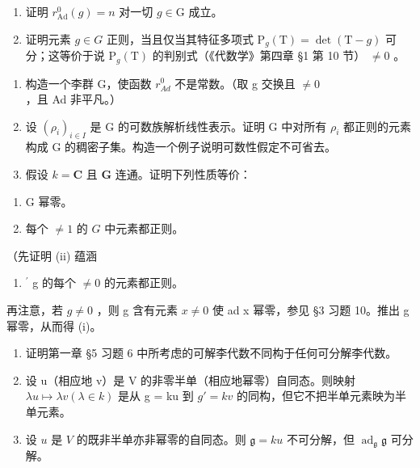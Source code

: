\begin{enumerate}
\def\labelenumi{\alph{enumi})}
\item
  证明 \(r_{\mathrm{Ad}}^0 (g) = n\) 对一切 \(g \in \mathrm{G}\) 成立。
\item
  证明元素 \(g \in G\) 正则，当且仅当其特征多项式 \(\mathrm{P}_{g}(\mathrm{T}) = \det(\mathrm{T} - g)\) 可分；这等价于说 \(\mathrm{P}_{g}(\mathrm{T})\) 的判别式（《代数学》第四章 §1 第 10 节） \(\neq 0\) 。
\end{enumerate}

\begin{enumerate}
\def\labelenumi{\arabic{enumi})}
\setcounter{enumi}{1}
\item
  构造一个李群 G，使函数 \(r_{Ad}^{0}\) 不是常数。（取 g 交换且 \(\neq 0\) ，且 Ad 非平凡。）
\item
  设 \((\rho_{i})_{i\in I}\) 是 G 的可数族解析线性表示。证明 G 中对所有 \(\rho_{i}\) 都正则的元素构成 G 的稠密子集。构造一个例子说明可数性假定不可省去。
\item
  假设 \(k = \mathbf{C}\) 且 \(\mathbf{G}\) 连通。证明下列性质等价：
\end{enumerate}

\begin{enumerate}
\def\labelenumi{(\roman{enumi})}
\item
  G 幂零。
\item
  每个 \(\neq 1\) 的 \(G\) 中元素都正则。
\end{enumerate}

（先证明 (ii) 蕴涵

\begin{enumerate}
\def\labelenumi{(\roman{enumi})}
\setcounter{enumi}{1}
\tightlist
\item
  \(^{\prime}\) g 的每个 \(\neq 0\) 的元素都正则。
\end{enumerate}

再注意，若 \(g \neq 0\) ，则 g 含有元素 \(x \neq 0\) 使 ad x 幂零，参见 §3 习题 10。推出 g 幂零，从而得 (i)。


\begin{enumerate}
\def\labelenumi{\arabic{enumi})}
\item
  证明第一章 §5 习题 6 中所考虑的可解李代数不同构于任何可分解李代数。
\item
  设 u（相应地 v）是 V 的非零半单（相应地幂零）自同态。则映射 \(\lambda u \mapsto \lambda v (\lambda \in k)\) 是从 g = ku 到 \(g' = kv\) 的同构，但它不把半单元素映为半单元素。
\item
  设 \(u\) 是 \(V\) 的既非半单亦非幂零的自同态。则 \(\mathfrak{g} = ku\) 不可分解，但 \(\operatorname{ad}_{\mathfrak{g}}\mathfrak{g}\) 可分解。
\end{enumerate}

